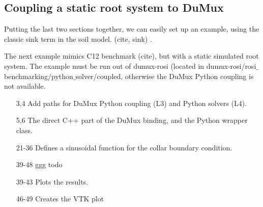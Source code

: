 \subsection{Coupling a static root system to DuMux} \label{sec:dumux_coupling}

Putting the last two sections together, we can easily set up an example, using the classic sink term in the soil model. (cite, sink) .

The next example mimics C12 benchmark (cite), but with a static simulated root system. The example must be run out of dumux-rosi (located in dumux-rosi/rosi$\_$benchmarking/python$\_$solver/coupled, otherwise the DuMux Python coupling is not available. 


\begin{itemize}

\item[3,4] Add paths for DuMux Python coupling (L3) and Python solvers (L4).

\item[5,6] The direct C++ part of the DuMux binding, and the Python wrapper class. 

\item[21-36] Defines a sinusoidal function for the collar boundary condition.

\item[39-48] ggg todo

\item[39-43] Plots the results.

\item[46-49] Creates the VTK plot

\end{itemize}



